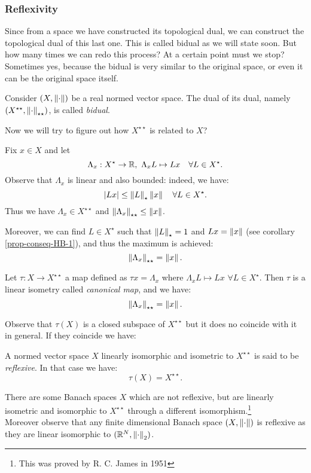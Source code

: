 \subsubsection{Reflexivity}
Since from a space we have constructed its topological dual, we can construct the topological dual of this last one. This is called bidual as we will state soon. But how many times we can redo this process? At a certain point must we stop? Sometimes yes, because the bidual is very similar to the original space, or even it can be the original space itself.

\begin{defn}
	Consider $(X, \left\lVert\cdot\right\rVert)$ be a real normed vector space.
	The dual of its dual, namely $(X^{\star\star}, \left\lVert\cdot\right\rVert_{\star\star})$, is called \emph{bidual}.
\end{defn}

Now we will try to figure out how $X^{\star\star}$ is related to $X$?

Fix $x\in X$ and let
$$\Lambda_x : X^\star \to \RR, \ 
\Lambda_x L\mapsto Lx
\quad \forall L \in X^\star.$$
Observe that $\Lambda_x$ is linear and also bounded: indeed, we have: 
$$|Lx|\leq \left\lVert L\right\rVert_\star \left\lVert x\right\rVert \quad \forall L \in X^\star.$$
Thus we have $\Lambda_x \in X^{\star\star}$ and $\left\lVert\Lambda_x\right\rVert_{\star\star} \leq \left\lVert x\right\rVert$.

Moreover, we can find $L\in X^\star$ such that $\left\lVert L\right\rVert_\star = 1$ and $Lx=\left\lVert x\right\rVert$ (see corollary \vref{prop-conseq-HB-1}), and thus the maximum is achieved:
$$\left\lVert\Lambda_x\right\rVert_{\star \star} = \left\lVert x\right\rVert.$$

\begin{defn}
	Let  $\tau : X \to X^{\star\star}$ a map defined as $\tau x = \Lambda_x$ where
	$\Lambda_x L\mapsto Lx$ $\forall L \in X^\star$.
	Then $\tau$ is a linear isometry called \emph{canonical map}, and we have:
	$$\left\lVert\Lambda_x\right\rVert_{\star\star} = \left\lVert x\right\rVert.$$
\end{defn}

Observe that $\tau(X)$ is a closed subspace of $X^{\star\star}$ but it does no coincide with it in general. 
If they coincide we have:

\begin{defn}
	A normed vector space $X$ linearly isomorphic and isometric to $X^{\star\star}$ is said to be \emph{reflexive}.
In that case we have:$$\tau(X) = X^{\star\star}.$$
\end{defn}

There are some Banach spaces $X$ which are not reflexive, but are linearly isometric and isomorphic to $X^{\star\star}$ through a different isomorphism.\footnote{This was proved by R. C. James in 1951}\\
Moreover observe that any finite dimensional Banach space $(X,\left\lVert\cdot\right\rVert)$ is reflexive as they are linear isomorphic to $(\mathbb R^N, \left\lVert\cdot\right\rVert_2)$.

